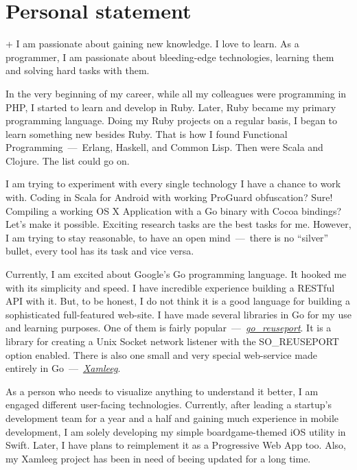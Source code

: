 \documentclass[12pt,a4paper,final]{moderncv}
\begin{document}
\section{Personal statement}
{\normalsize\parindent=1cm
  \begin{adjustwidth}{\hintscolumnwidth+\separatorcolumnwidth}{}
    I am passionate about gaining new knowledge. I love to learn. As a programmer, I am passionate about bleeding-edge technologies, learning them and solving hard tasks with them.

    In the very beginning of my career, while all my colleagues were programming in PHP, I started to learn and develop in Ruby. Later, Ruby became my primary programming language. Doing my Ruby projects on a regular basis, I began to learn something new besides Ruby. That is how I found Functional Programming~---~Erlang, Haskell, and Common Lisp. Then were Scala and Clojure. The list could go on.

    I am trying to experiment with every single technology I have a chance to work with. Coding in Scala for Android with working ProGuard obfuscation? Sure! Compiling a working OS X Application with a Go binary with Cocoa bindings? Let's make it possible. Exciting research tasks are the best tasks for me. However, I am trying to stay reasonable, to have an open mind~---~there is no ``silver'' bullet, every tool has its task and vice versa.

    Currently, I am excited about Google's Go programming language. It hooked me with its simplicity and speed. I have incredible experience building a RESTful API with it. But, to be honest, I do not think it is a good language for building a sophisticated full-featured web-site. I have made several libraries in Go for my use and learning purposes. One of them is fairly popular~---~\underline{\href{https://github.com/kavu/go\_reuseport}{\itshape go\_reuseport}}. It is a library for creating a Unix Socket network listener with the SO\_REUSEPORT option enabled. There is also one small and very special web-service made entirely in Go~---~\underline{\href{http://xamleeg.kavu.ru/}{\itshape Xamleeg}}.

    As a person who needs to visualize anything to understand it better, I am engaged different user-facing technologies. Currently, after leading a startup's development team for a year and a half and gaining much experience in mobile development, I am solely developing my simple boardgame-themed iOS utility in Swift. Later, I have plans to reimplement it as a Progressive Web App too. Also, my Xamleeg project has been in need of beeing updated for a long time.


\end{adjustwidth}}
\end{document}
